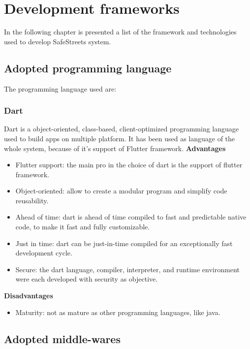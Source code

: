 \documentclass[../ITD.tex]{subfiles}
\begin{document}
    \chapter{Development frameworks}\label{ch: development-frameworks}
    In the following chapter is presented a list of the framework and technologies used to develop SafeStreets system.
    \section{Adopted programming language}\label{sec:adopted-programming-laguage}
    The programming language used are:
    \subsection{Dart}\label{subsec:dart}
    Dart is a object-oriented, class-based, client-optimized programming language used to build apps on multiple platform.
    It has been used as language of the whole system, because of it's support of Flutter framework.
    \newline
    \textbf{Advantages}
    \begin{itemize}
        \item Flutter support: the main pro in the choice of dart is the support of flutter framework.
        \item Object-oriented: allow to create a modular program and simplify code reusability.
        \item Ahead of time: dart is ahead of time compiled to fast and predictable native code, to make it fast and fully customizable.
        \item Just in time: dart can be just-in-time compiled for an exceptionally fast development cycle.
        \item Secure: the dart language, compiler, interpreter, and runtime environment were each developed with security as objective.
    \end{itemize}
    \newline
    \textbf{Disadvantages}
    \begin{itemize}
        \item Maturity: not as mature as other programming languages, like java.
    \end{itemize}

    \section{Adopted middle-wares}\label{sec:adopted-middle-wares}
\end{document}
